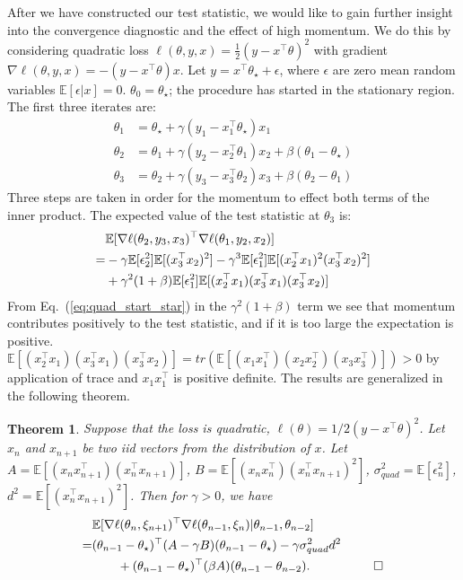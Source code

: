 \documentclass[conference]{IEEEtran}
\newcommand{\Ex}[1]{\mathbb{E}[ #1 ]}
\newtheorem{theorem}{Theorem}
\begin{document}
After we have constructed our test statistic, we would like to gain further insight into the convergence diagnostic and the effect of high momentum.
We do this by considering quadratic loss $\ell ( \theta, y, x ) = \frac{1}{2} ( y - x^\top \theta )^2$ with gradient $\nabla \ell ( \theta, y, x ) = - ( y - x^\top \theta) x$.
Let $y = x^\top \theta_\star + \epsilon$, where $\epsilon$ are zero mean random variables $\Ex{ \epsilon | x } = 0$. $\theta_0 = \theta_\star$; the procedure has started in the stationary region.
The first three iterates are:
\begin{align*}
\theta_1 &= \theta_\star + \gamma ( y_1 - x_1^\top \theta_\star ) x_1 \\
\theta_2 &= \theta_1 + \gamma ( y_2 - x_2^\top \theta_1 ) x_2 + \beta ( \theta_1 - \theta_\star ) \\
\theta_3 &= \theta_2 + \gamma ( y_3 - x_3^\top \theta_2 ) x_3 + \beta ( \theta_2 - \theta_1 )
\end{align*}
Three steps are taken in order for the momentum to effect both terms of the inner product.
The expected value of the test statistic at $\theta_3$ is:
\begin{align}\notag
&\Ex{ \nabla \ell ( \theta_2, y_3, x_3 )^\top \nabla \ell ( \theta_1, y_2, x_2 ) }  \\
=& - \gamma \Ex{ \epsilon_2^2 } \Ex{ ( x_3^\top x_2 )^2 } - \gamma^3 \Ex { \epsilon_1^2 } \Ex { ( x_2^\top x_1 )^2 ( x_3^\top x_2 )^2 } \nonumber \\\label{eq:quad_start_star}
& + \gamma^2 ( 1 + \beta ) \Ex{ \epsilon_1^2 } \Ex{ ( x_2^\top x_1 ) ( x_3^\top x_1 ) ( x_3^\top x_2 ) } 
\end{align}
From Eq.~(\ref{eq:quad_start_star}) in the $\gamma^2 (1+\beta)$ term we see that momentum contributes positively to the test statistic, and if it is too large the expectation is positive.  $\Ex{ ( x_2^\top x_1 ) ( x_3^\top x_1 ) ( x_3^\top x_2 ) } = tr( \Ex{(x_1 x_1^\top) (x_2 x_2^\top) (x_3 x_3^\top) } ) > 0$ by application of trace and $x_1 x_1^\top$ is positive definite.
The results are generalized in the following theorem. 
\begin{theorem}
\label{thm:quad_diag}
Suppose that the loss is quadratic, $\ell ( \theta ) = 1/2 ( y - x^\top \theta )^2$. 
Let $x_n$ and $x_{n+1}$ be two iid vectors from the distribution of $x$.
Let $A = \Ex{ ( x_n x_{n+1}^\top ) ( x_n^\top x_{n+1} ) }$, $B = \Ex{ ( x_{n} x_n^\top ) ( x_n^\top x_{n+1} )^2 }$, $\sigma_{quad}^2 = \Ex { \epsilon_n^2 }$, $d^2 = \Ex{ ( x_n^\top x_{n+1} )^2 }$.
Then for $\gamma > 0$, we have
\begin{align}\notag
&\Ex{ \nabla \ell ( \theta_n, \xi_{n+1} )^\top \nabla \ell ( \theta_{n-1}, \xi_n ) |  \theta_{n-1}, \theta_{n-2} } \\\notag
=& ( \theta_{n-1} - \theta_\star )^\top ( A - \gamma B) ( \theta_{n-1} - \theta_\star )
- \gamma \sigma_{quad}^2 d^2 \\\notag
&\quad\quad + ( \theta_{n-1} - \theta_\star )^\top ( \beta A ) ( \theta_{n-1} - \theta_{n-2} ).\hspace{0.7in} \Box
\end{align}
\end{theorem}
\end{document}
